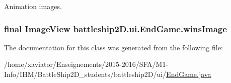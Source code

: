 Animation images. 

\hypertarget{classbattleship2D_1_1ui_1_1EndGame_a81c8d84b9284288f67fff7273fd7e7e3}{
\subsubsection[{wins\-Image}]{\setlength{\rightskip}{0pt plus 5cm}final Image\-View battleship2\-D.\-ui.\-End\-Game.\-wins\-Image\hspace{0.3cm}{\ttfamily [package]}}}\label{classbattleship2D_1_1ui_1_1EndGame_a81c8d84b9284288f67fff7273fd7e7e3}


The documentation for this class was generated from the following file\-:\begin{DoxyCompactItemize}
\item 
/home/xaviator/\-Enseignements/2015-\/2016/\-S\-F\-A/\-M1-\/\-Info/\-I\-H\-M/\-Battle\-Ship2\-D\-\_\-students/battleship2\-D/ui/\hyperlink{EndGame_8java}{End\-Game.\-java}\end{DoxyCompactItemize}
